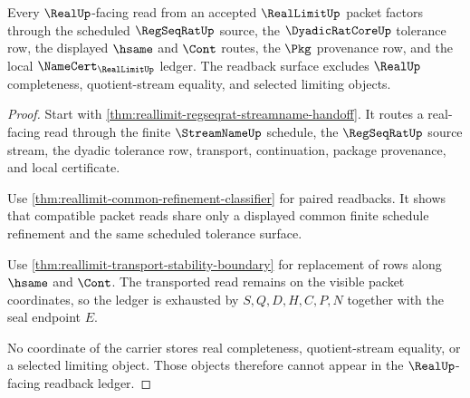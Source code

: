 \begin{theorem}
\label{thm:reallimit-readback-ledger-exhaustion}
Every $\RealUp$-facing read from an accepted $\RealLimitUp$ packet factors
through the scheduled $\RegSeqRatUp$ source, the $\DyadicRatCoreUp$ tolerance
row, the displayed $\hsame$ and $\Cont$ routes, the $\Pkg$ provenance row, and
the local $\NameCert_{\RealLimitUp}$ ledger. The readback surface excludes
$\RealUp$ completeness, quotient-stream equality, and selected limiting
objects.
\end{theorem}
\begin{proof}
Start with \autoref{thm:reallimit-regseqrat-streamname-handoff}. It routes a
real-facing read through the finite $\StreamNameUp$ schedule, the
$\RegSeqRatUp$ source stream, the dyadic tolerance row, transport,
continuation, package provenance, and local certificate.

Use \autoref{thm:reallimit-common-refinement-classifier} for paired readbacks.
It shows that compatible packet reads share only a displayed common finite
schedule refinement and the same scheduled tolerance surface.

Use \autoref{thm:reallimit-transport-stability-boundary} for replacement of
rows along $\hsame$ and $\Cont$. The transported read remains on the visible
packet coordinates, so the ledger is exhausted by $S,Q,D,H,C,P,N$ together
with the seal endpoint $E$.

No coordinate of the carrier stores real completeness, quotient-stream
equality, or a selected limiting object. Those objects therefore cannot appear
in the $\RealUp$-facing readback ledger.
\end{proof}


